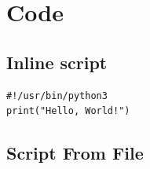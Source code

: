 \documentclass{article}
\begin{document}
  \section{Code}
    \subsection{Inline script}
    \begin{lstlisting}
#!/usr/bin/python3
print("Hello, World!")
    \end{lstlisting}

    \subsection{Script From File}
    

  \newpage
  \printbibliography

  \newpage
  \newpage
  \begin{appendix}
    \listoffigures
    \listoftables
  \end{appendix}
\end{document}
